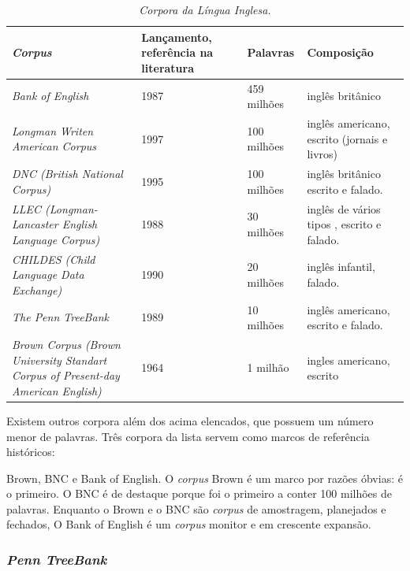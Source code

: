 \begin{table}
   \centering
   \small
   \caption{\it Corpora da Língua Inglesa.}

   \begin{tabular}{ | p{5cm} | p{3cm} | p{3cm} | p{3cm} | }
      \hline
        \textbf{\emph{Corpus}} & \textbf{Lançamento, referência na literatura} & \textbf{Palavras}& \textbf{Composição}\\
        \hline
        \hline
        \emph{Bank of English} & 1987 \footnotemark[1] & 459 milhões & inglês britânico\\
        \hline
        \emph{Longman Writen American Corpus} & 1997 & 100 milhões  & inglês americano, escrito (jornais e livros)\\
        \hline
        \emph{DNC (British National Corpus)} & 1995 & 100 milhões  & inglês britânico escrito e falado.\\
        \hline
        \emph{LLEC (Longman-Lancaster English Language Corpus)} & 1988 & 30 milhões  & inglês de vários tipos , escrito e falado.\\
        \hline
        \emph{CHILDES (Child Language Data Exchange)} & 1990 & 20 milhões & inglês infantil, falado.\\
        \hline
        \emph{The Penn TreeBank} & 1989 & 10 milhões & inglês americano, escrito e falado.\\
        \hline
        \emph{Brown Corpus (Brown University Standart Corpus of Present-day American English)} & 1964 & 1 milhão  & ingles americano, escrito\\
        \hline
   \end{tabular}
   \label{tbl:corpora}
\end{table}

Existem outros corpora além dos acima elencados, que possuem um número menor de palavras. Três corpora da lista servem como marcos de referência históricos:

Brown, BNC e Bank of English. O \emph{corpus} Brown é um marco por razões óbvias: é o primeiro. O BNC é de destaque porque foi o primeiro a conter 100 milhões de palavras. Enquanto o Brown e o BNC são \emph{corpus} de amostragem, planejados e fechados, O Bank of English é um \emph{corpus} monitor e em crescente expansão.


\subsubsection{\emph{Penn TreeBank}}
\label{sub:corpus_ingles_esquema_pen}

